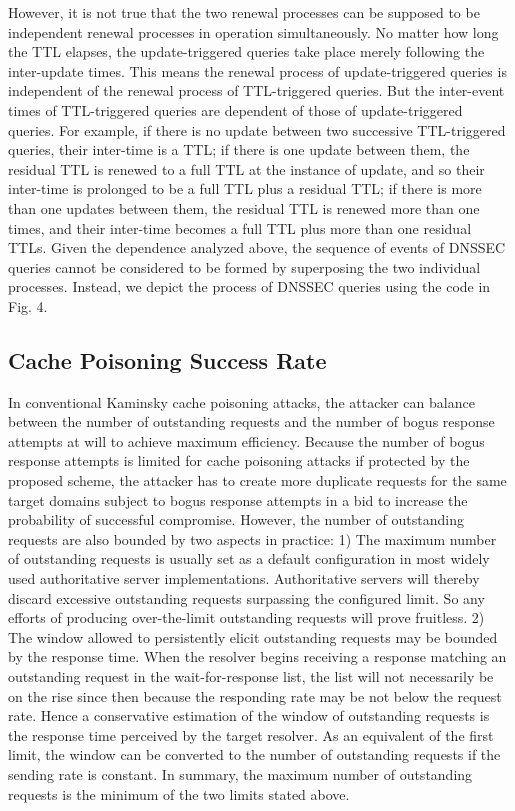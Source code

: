 \documentclass[conference]{IEEEtran}
\begin{document}
However, it is not true that the two renewal processes can be supposed to be independent renewal processes in operation simultaneously. No matter how long the TTL elapses, the update-triggered queries take place merely following the inter-update times. This means the renewal process of update-triggered queries is independent of the renewal process of TTL-triggered queries. But the inter-event times of TTL-triggered queries are dependent of those of update-triggered queries. For example, if there is no update between two successive TTL-triggered queries, their inter-time is a TTL; if there is one update between them, the residual TTL is renewed to a full TTL at the instance of update, and so their inter-time is prolonged to be a full TTL plus a residual TTL; if there is more than one updates between them, the residual TTL is renewed more than one times, and their inter-time becomes a full TTL plus more than one residual TTLs. Given the dependence analyzed above, the sequence of events of DNSSEC queries cannot be considered to be formed by superposing the two individual processes. Instead, we depict the process of DNSSEC queries using the code in Fig. 4.

\subsection{Cache Poisoning Success Rate}

In conventional Kaminsky cache poisoning attacks, the attacker can balance between the number of outstanding requests and the number of bogus response attempts at will to achieve maximum efficiency. Because the number of bogus response attempts is limited for cache poisoning attacks if protected by the proposed scheme, the attacker has to create more duplicate requests for the same target domains subject to bogus response attempts in a bid to increase the probability of successful compromise. However, the number of outstanding requests are also bounded by two aspects in practice: 1) The maximum number of outstanding requests is usually set as a default configuration in most widely used authoritative server implementations. Authoritative servers will thereby discard excessive outstanding requests surpassing the configured limit. So any efforts of producing over-the-limit outstanding requests will prove fruitless. 2) The window allowed to persistently elicit outstanding requests may be bounded by the response time. When the resolver begins receiving a response matching an outstanding request in the wait-for-response list, the list will not necessarily be on the rise since then because the responding rate may be not below the request rate. Hence a conservative estimation of the window of outstanding requests is the response time perceived by the target resolver. As an equivalent of the first limit, the window can be converted to the number of outstanding requests if the sending rate is constant. In summary, the maximum number of outstanding requests is the minimum of the two limits stated above.
\end{document}
